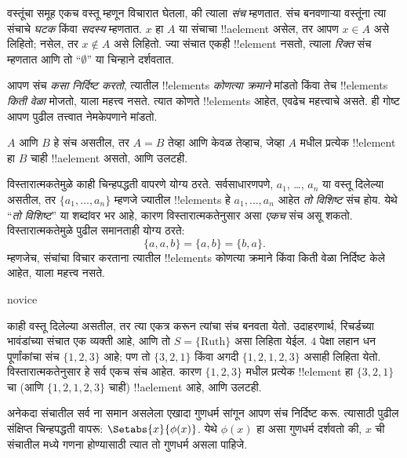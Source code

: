 \documentclass[../../../include/open-logic-section]{subfiles}
\begin{document}

वस्तूंचा समूह एकच वस्तू {म्हणून} विचारात घेतला, की त्याला \emph{संच} म्हणतात.
संच बनवणाऱ्या वस्तूंना त्या संचाचे \emph{घटक} किंवा \emph{सदस्य} म्हणतात.
$x$ हा $A$ या संचाचा !!a{element} असेल, तर आपण $x \in A$ असे लिहितो;
नसेल, तर $x \notin A$ असे लिहितो. ज्या संचात एकही !!{element} नसतो,
त्याला \emph{रिक्त} संच म्हणतात आणि तो ``$\emptyset$'' या चिन्हाने दर्शवतात.

\begin{explain}
आपण संच \emph{कसा निर्दिष्ट करतो}, त्यातील !!{element}s \emph{कोणत्या क्रमाने}
मांडतो किंवा तेच !!{element}s \emph{किती वेळा} मोजतो, याला महत्त्व नसते.
त्यात कोणते !!{element}s आहेत, एवढेच महत्त्वाचे असते. ही गोष्ट आपण पुढील
तत्त्वात नेमकेपणाने मांडतो.
\end{explain}

\begin{defn}[विस्तारात्मकता]
  $A$ आणि $B$ हे संच असतील, तर $A = B$ तेव्हा आणि केवळ तेव्हाच, जेव्हा
  $A$ मधील प्रत्येक !!{element} हा $B$ चाही !!a{element} असतो, आणि उलटही.
\end{defn}

विस्तारात्मकतेमुळे काही चिन्हपद्धती वापरणे योग्य ठरते. सर्वसाधारणपणे,
$a_{1}$, \dots, $a_{n}$ या वस्तू दिलेल्या असतील, तर
$\{a_{1}, \dots, a_{n}\}$ म्हणजे ज्यातील !!{element}s हे
$a_1, \ldots, a_n$ आहेत \emph{तो विशिष्ट} संच होय. येथे ``\emph{तो विशिष्ट}''
या शब्दांवर भर आहे, कारण विस्तारात्मकतेनुसार असा \emph{एकच} संच असू शकतो.
विस्तारात्मकतेमुळे पुढील समानताही योग्य ठरते:
  \[
    \{a, a, b\} = \{a, b\} = \{b,a\}.
  \]
म्हणजेच, संचांचा विचार करताना त्यातील !!{element}s कोणत्या क्रमाने किंवा
किती वेळा निर्दिष्ट केले आहेत, याला महत्त्व नसते.

\begin{tagblock}{novice}
\begin{ex}
काही वस्तू दिलेल्या असतील, तर त्या एकत्र करून त्यांचा संच बनवता येतो.
उदाहरणार्थ, रिचर्डच्या भावंडांच्या संचात एक व्यक्ती आहे, आणि तो
$S=\{\textrm{Ruth}\}$ असा लिहिता येईल.
$4$ पेक्षा लहान धन पूर्णांकांचा संच $\{1, 2, 3\}$ आहे; पण तो
$\{3, 2, 1\}$ किंवा अगदी $\{1, 2, 1, 2, 3\}$ असाही लिहिता येतो.
विस्तारात्मकतेनुसार हे सर्व एकच संच आहेत. कारण $\{1, 2, 3\}$ मधील
प्रत्येक !!{element} हा $\{3, 2, 1\}$ चा (आणि $\{1,
2, 1, 2, 3\}$ चाही) !!a{element} आहे, आणि उलटही.
\end{ex}
\end{tagblock}

अनेकदा संचातील सर्व ना समान असलेला एखादा गुणधर्म सांगून आपण
संच निर्दिष्ट करू. त्यासाठी पुढील संक्षिप्त चिन्हपद्धती वापरू:
$\Setabs{x}{\phi(x)}$. येथे $\phi(x)$ हा असा गुणधर्म दर्शवतो की,
$x$ ची संचातील मध्ये गणना होण्यासाठी त्यात तो गुणधर्म असला पाहिजे.
\end{document}
